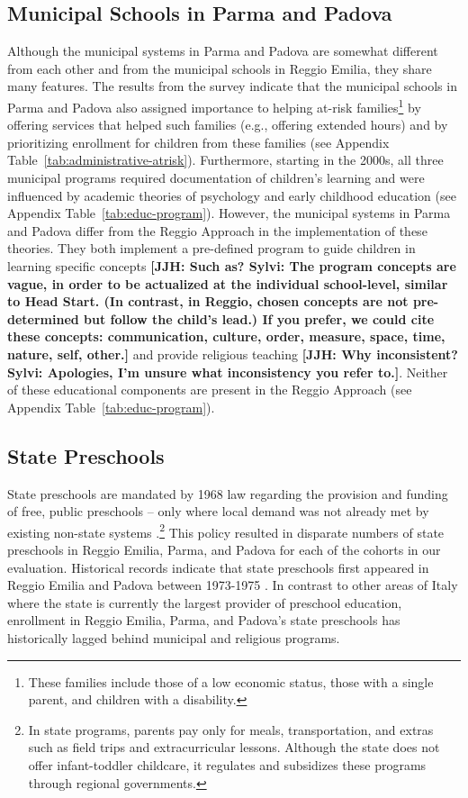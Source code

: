 \subsection{Municipal Schools in Parma and Padova}
Although the municipal systems in Parma and Padova are somewhat different from each other and from the municipal schools in Reggio Emilia, they share many features. The results from the survey indicate that the municipal schools in Parma and Padova also assigned importance to helping at-risk families\footnote{These families include those of a low economic status, those with a single parent, and children with a disability.} by offering services that helped such families (e.g., offering extended hours) and by prioritizing enrollment for children from these families (see Appendix Table~\ref{tab:administrative-atrisk}). Furthermore, starting in the 2000s, all three municipal programs required documentation of children's learning and were influenced by academic theories of psychology and early childhood education (see Appendix Table~\ref{tab:educ-program}). However, the municipal systems in Parma and Padova differ from the Reggio Approach in the implementation of these theories. They both implement a pre-defined program to guide children in learning specific concepts \textbf{[JJH: Such as? Sylvi: The program concepts are vague, in order to be actualized at the individual school-level, similar to Head Start. (In contrast, in Reggio, chosen concepts are not pre-determined but follow the child's lead.) If you prefer, we could cite these concepts: communication, culture, order, measure, space, time, nature, self, other.]} and provide religious teaching \textbf{[JJH: Why inconsistent? Sylvi: Apologies, I'm unsure what inconsistency you refer to.]}. Neither of these educational components are present in the Reggio Approach (see Appendix Table~\ref{tab:educ-program}).

\subsection{State Preschools}
State preschools are mandated by 1968 law regarding the provision and funding of free, public preschools -- only where local demand was not already met by existing non-state systems \citep{Hohnerlein_2009_Paradox-Public-Preschools}.\footnote{In state programs, parents pay only for meals, transportation, and extras such as field trips and extracurricular lessons. Although the state does not offer infant-toddler childcare, it regulates and subsidizes these programs through regional governments.} This policy resulted in disparate numbers of state preschools in Reggio Emilia, Parma, and Padova for each of the cohorts in our evaluation. Historical records indicate that state preschools first appeared in Reggio Emilia and Padova between 1973-1975 \citep{Padova-Admin-Data_1964-2011,Reggio-Admin-data_1966-2006,Reggio-Annual-Journals_1994-2011}. In contrast to other areas of Italy where the state is currently the largest provider of preschool education, enrollment in Reggio Emilia, Parma, and Padova's state preschools has historically lagged behind municipal and religious programs.

